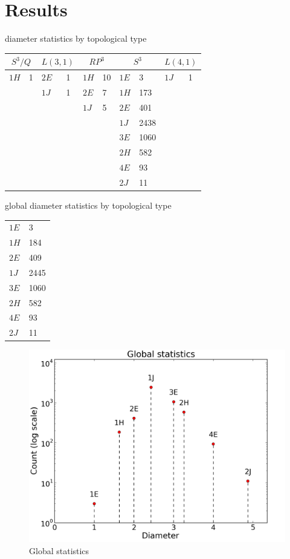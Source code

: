 \documentclass[12pt]{article}
\begin{document}
\section{Results}

diameter statistics by topological type

\begin{tabular} {| l l | l l | l l | l l | l l |}
\hline
\multicolumn{2}{|c|}{$S^{3}/Q$} &
\multicolumn{2}{|c|}{$L(3,1)$} &
\multicolumn{2}{|c|}{$RP^{3}$} &
\multicolumn{2}{|c|}{$S^{3}$} &
\multicolumn{2}{|c|}{$L(4,1)$} \\
\hline
\hline
$1H$&1    &$2E$&1    &$1H$&10    &$1E$&3    &$1J$&1 \\
  &       &$1J$&1    &$2E$&7     &$1H$&173  &    &  \\
  &       &  &       &$1J$&5     &$2E$&401  &    &  \\
  &       &  &       &    &      &$1J$&2438 &    &  \\
  &       &  &       &    &      &$3E$&1060 &    &  \\
  &       &  &       &    &      &$2H$&582  &    &  \\
  &       &  &       &    &      &$4E$&93   &    &  \\
  &       &  &       &    &      &$2J$&11   &    &  \\
\hline
\end{tabular}

global diameter statistics by topological type

\begin{tabular} {| l l |}
\hline
$1E$ &       3\\
$1H$ &       184\\
$2E$ &       409\\
$1J$ &       2445\\
$3E$ &       1060\\
$2H$ &       582\\
$4E$ &       93\\
$2J$ &       11\\
\hline
\end{tabular}


\begin{figure}
    \begin{center}
    \includegraphics[width=0.6\linewidth]{figures/global_statistics.png}
    \caption{Global statistics}
    \end{center}
\end{figure}



\end{document}
